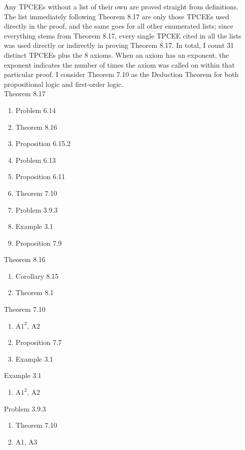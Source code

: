\documentclass[11pt]{hmcpset}
\newenvironment{problem1}[1]{\noindent {\bf Problem #1}}
{\medskip}
\begin{document}
\begin{problem1}{3. (a)} Any TPCEEs without a list of their own are proved straight from definitions. The list immediately following Theorem 8.17 are only those TPCEEs used directly in the proof, and the same goes for all other enumerated lists; since everything stems from Theorem 8.17, every single TPCEE cited in all the lists was used directly or indirectly in proving Theorem 8.17. In total, I count 31 distinct TPCEEs plus the 8 axioms. When an axiom has an exponent, the exponent indicates the number of times the axiom was called on within that particular proof. I consider Theorem 7.10 as the Deduction Theorem for both propositional logic and first-order logic.\\

\noindent Theorem 8.17
\begin{enumerate}
\item{Problem 6.14}
\item{Theorem 8.16}
\item{Proposition 6.15.2}
\item{Problem 6.13}
\item{Proposition 6.11}
\item{Theorem 7.10}
\item{Problem 3.9.3}
\item{Example 3.1}
\item{Proposition 7.9}\\
\end{enumerate}

\noindent Theorem 8.16
\begin{enumerate}
\item{Corollary 8.15}
\item{Theorem 8.1}\\
\end{enumerate}

\noindent Theorem 7.10
\begin{enumerate}
\item{A$1^2$, A$2$}
\item{Proposition 7.7}
\item{Example 3.1}\\
\end{enumerate}

\noindent Example 3.1
\begin{enumerate}
\item{A$1^2$, A2}\\
\end{enumerate}

\noindent Problem 3.9.3
\begin{enumerate}
\item{Theorem 7.10}
\item{A1, A3}\\
\end{enumerate}


\end{problem1}
\end{document}

